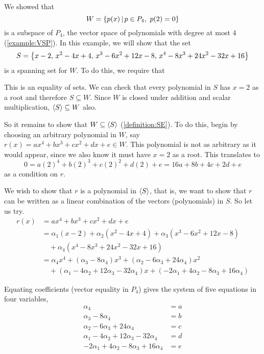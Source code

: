 \documentclass{ximera}
\begin{document}
\begin{example}
  We showed that
  \[
    W=\left\lbrace p(x)\,\middle|\,p\in P_4,\ p(2)=0\right\rbrace
  \]
  is a subspace of $P_4$, the vector space of polynomials with degree
  at most $4$ (\ref{example:VSP}).  In this example, we will show that
  the set
  \[
    S=\left\{x-2,\,x^2-4x+4,\,x^3-6x^2+12x-8,\,x^4-8x^3+24x^2-32x+16\right\}
  \]
  is a spanning set for $W$.  To do this, we require that 
  \begin{multipleChoice}
  \end{multipleChoice}
  This is an equality of sets.  We can check that every polynomial in
  $S$ has $x=2$ as a root and therefore $S\subseteq W$.  Since $W$ is
  closed under addition and scalar multiplication,
  $\left\langle S\right\rangle\subseteq W$ also.

  So it remains to show that $W\subseteq \left\langle S\right\rangle$
  (\ref{definition:SE}).  To do this, begin by choosing an arbitrary
  polynomial in $W$, say $r(x)=ax^4+bx^3+cx^2+dx+e\in W$.  This
  polynomial is not as arbitrary as it would appear, since we also
  know it must have $x=2$ as a root.  This translates to
  \[
    0=a(2)^4+b(2)^3+c(2)^2+d(2)+e=16a+8b+4c+2d+e
  \]
  as a condition on $r$.

  We wish to show that $r$ is a polynomial in $\left\langle S\right\rangle$, that is, we
  want to show that $r$ can be written as a linear combination of the
  vectors (polynomials) in $S$.  So let us try.
  \begin{align*}
    r(x)&=ax^4+bx^3+cx^2+dx+e\\
        &=\alpha_1\left(x-2\right)+\alpha_2\left(x^2-4x+4\right)+\alpha_3\left(x^3-6x^2+12x-8\right)\\
        &\quad +\alpha_4\left(x^4-8x^3+24x^2-32x+16\right)\\
        &=\alpha_4x^4+
          \left(\alpha_3-8\alpha_4\right)x^3+
          \left(\alpha_2-6\alpha_3+24\alpha_4\right)x^2\\
        &\quad +
          \left(\alpha_1-4\alpha_2+12\alpha_3-32\alpha_4\right)x+
          \left(-2\alpha_1+4\alpha_2-8\alpha_3+16\alpha_4\right)
  \end{align*}

  Equating coefficients (vector equality in $P_4$) gives the system of
  five equations in four variables,
  \begin{align*}
    \alpha_4&=a\\
    \alpha_3-8\alpha_4&=b\\
    \alpha_2-6\alpha_3+24\alpha_4&=c\\
    \alpha_1-4\alpha_2+12\alpha_3-32\alpha_4&=d\\
    -2\alpha_1+4\alpha_2-8\alpha_3+16\alpha_4&=e\\
  \end{align*}


\end{example}
\end{document}
